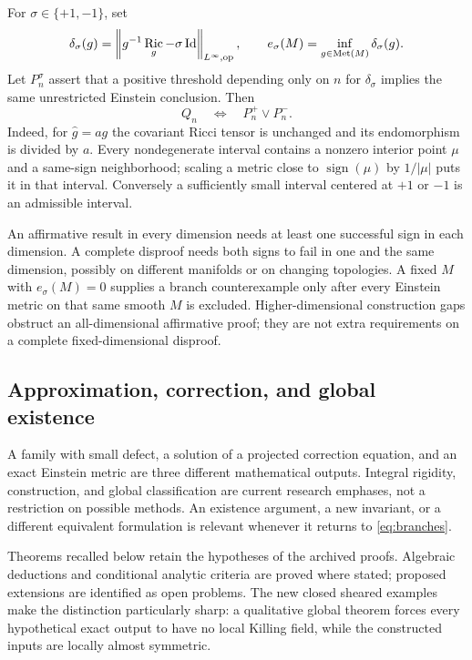 \documentclass[a4paper,11pt]{article}
\theoremstyle{definition}
\DeclareMathOperator{\Ric}{Ric}\DeclareMathOperator{\Rm}{Rm}
\DeclareMathOperator{\Id}{Id}\DeclareMathOperator{\Div}{div}
\DeclareMathOperator{\Met}{Met}\DeclareMathOperator{\sech}{sech}
\newcommand{\norm}[1]{\left\lVert#1\right\rVert}
\begin{document}
For $\sigma\in\{+1,-1\}$, set
\begin{equation}\label{eq:defect}
 \delta_\sigma(g)=\norm{g^{-1}\Ric_g-\sigma\Id}_{L^\infty,\op},
 \qquad e_\sigma(M)=\inf_{g\in\Met(M)}\delta_\sigma(g).
\end{equation}
Let $P_n^\sigma$ assert that a positive threshold depending only on $n$
for $\delta_\sigma$ implies the same unrestricted Einstein conclusion.
Then
\begin{equation}\label{eq:branches}
                  Q_n\quad\Longleftrightarrow\quad P_n^+\lor P_n^-.
\end{equation}
Indeed, for $\widehat g=ag$ the covariant Ricci tensor is unchanged and
its endomorphism is divided by $a$. Every nondegenerate interval contains
a nonzero interior point $\mu$ and a same-sign neighborhood; scaling a
metric close to $\operatorname{sign}(\mu)$ by $1/|\mu|$ puts it in that
interval. Conversely a sufficiently small interval centered at $+1$ or
$-1$ is an admissible interval.

An affirmative result in every dimension needs at least one successful
sign in each dimension. A complete disproof needs both signs to fail in
one and the same dimension, possibly on different manifolds or on changing
topologies. A fixed $M$ with $e_\sigma(M)=0$ supplies a branch counterexample
only after every Einstein metric on that same smooth $M$ is excluded.
Higher-dimensional construction gaps obstruct an all-dimensional
affirmative proof; they are not extra requirements on a complete
fixed-dimensional disproof.

\subsection{Approximation, correction, and global existence}\label{sec:levels}
A family with small defect, a solution of a projected correction equation,
and an exact Einstein metric are three different mathematical outputs.
Integral rigidity, construction, and global classification are current
research emphases, not a restriction on possible methods. An existence
argument, a new invariant, or a different equivalent formulation is
relevant whenever it returns to \eqref{eq:branches}.

Theorems recalled below retain the hypotheses of the archived proofs.
Algebraic deductions and conditional analytic criteria are proved where
stated; proposed extensions are identified as open problems.
The new closed sheared examples make
the distinction particularly sharp: a qualitative global theorem forces
every hypothetical exact output to have no local Killing field, while
the constructed inputs are locally almost symmetric.
\end{document}
